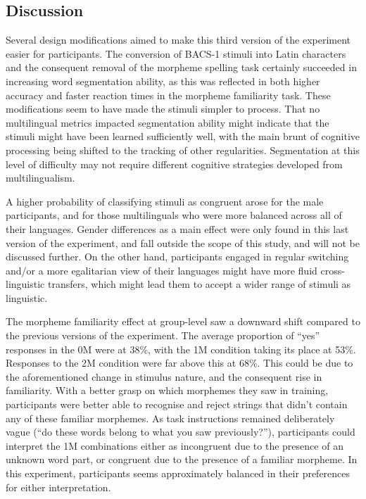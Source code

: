 \subsection{Discussion}
\label{Discussion3}
\setlength{\parindent}{20pt}
\justifying

\noindent
Several design modifications aimed to make this third version of the experiment easier for participants. The conversion of BACS-1 stimuli into Latin characters and the consequent removal of the morpheme spelling task certainly succeeded in increasing word segmentation ability, as this was reflected in both higher accuracy and faster reaction times in the morpheme familiarity task. These modifications seem to have made the stimuli simpler to process. That no multilingual metrics impacted segmentation ability might indicate that the stimuli might have been learned sufficiently well, with the main brunt of cognitive processing being shifted to the tracking of other regularities. Segmentation at this level of difficulty may not require different cognitive strategies developed from multilingualism.

A higher probability of classifying stimuli as congruent arose for the male participants, and for those multilinguals who were more balanced across all of their languages. Gender differences as a main effect were only found in this last version of the experiment, and fall outside the scope of this study, and will not be discussed further. On the other hand, participants engaged in regular switching and/or a more egalitarian view of their languages might have more fluid cross-linguistic transfers, which might lead them to accept a wider range of stimuli as linguistic.

The morpheme familiarity effect at group-level saw a downward shift compared to the previous versions of the experiment. The average proportion of ``yes'' responses in the 0M were at 38\%, with the 1M condition taking its place at 53\%. Responses to the 2M condition were far above this at 68\%. This could be due to the aforementioned change in stimulus nature, and the consequent rise in familiarity. With a better grasp on which morphemes they saw in training, participants were better able to recognise and reject strings that didn't contain any of these familiar morphemes. As task instructions remained deliberately vague (``do these words belong to what you saw previously?''), participants could interpret the 1M combinations either as incongruent due to the presence of an unknown word part, or congruent due to the presence of a familiar morpheme. In this experiment, participants seems approximately balanced in their preferences for either interpretation.

